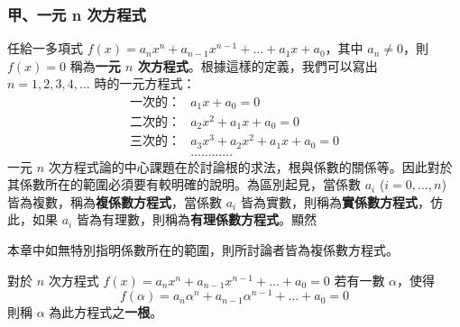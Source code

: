 \subsubsection*{甲、一元 n 次方程式}\label{subsec:b6-2-1-a}

任給一多項式 $f(x) = a_n x^n + a_{n-1} x^{n-1} + \dots + a_1 x + a_0$，其中 $a_n \ne 0$，則 $f(x)=0$ 稱為\textbf{一元 $n$ 次方程式}。根據這樣的定義，我們可以寫出 $n=1, 2, 3, 4, \dots$ 時的一元方程式：
\begin{align*}
\text{一次的：}& a_1 x + a_0 = 0 \\
\text{二次的：}& a_2 x^2 + a_1 x + a_0 = 0 \\
\text{三次的：}& a_3 x^3 + a_2 x^2 + a_1 x + a_0 = 0 \\
&\dots\dots\dots\dots
\end{align*}
一元 $n$ 次方程式論的中心課題在於討論根的求法，根與係數的關係等。因此對於其係數所在的範圍必須要有較明確的說明。為區別起見，當係數 $a_i$ ($i=0, \dots, n$) 皆為複數，稱為\textbf{複係數方程式}，當係數 $a_i$ 皆為實數，則稱為\textbf{實係數方程式}，仿此，如果 $a_i$ 皆為有理數，則稱為\textbf{有理係數方程式}。顯然

\begin{center}
\end{center}

本章中如無特別指明係數所在的範圍，則所討論者皆為複係數方程式。

\begin{definition}\label{def:b6-2-1}
對於 $n$ 次方程式 $f(x) = a_n x^n + a_{n-1} x^{n-1} + \dots + a_0 = 0$ 若有一數 $\alpha$，使得
\[ f(\alpha) = a_n \alpha^n + a_{n-1} \alpha^{n-1} + \dots + a_0 = 0 \]
則稱 $\alpha$ 為此方程式之\textbf{一根}。
\end{definition}

